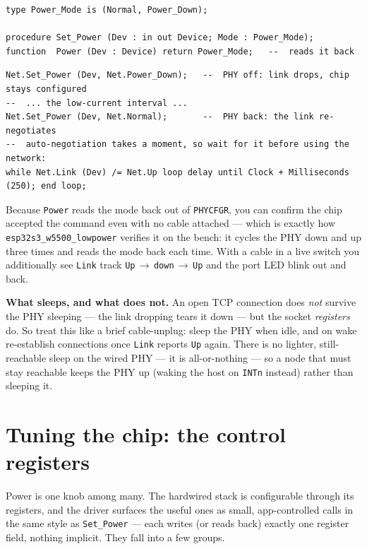 \begin{lstlisting}
type Power_Mode is (Normal, Power_Down);

procedure Set_Power (Dev : in out Device; Mode : Power_Mode);
function  Power (Dev : Device) return Power_Mode;   --  reads it back
\end{lstlisting}

\begin{lstlisting}
Net.Set_Power (Dev, Net.Power_Down);   --  PHY off: link drops, chip stays configured
--  ... the low-current interval ...
Net.Set_Power (Dev, Net.Normal);       --  PHY back: the link re-negotiates
--  auto-negotiation takes a moment, so wait for it before using the network:
while Net.Link (Dev) /= Net.Up loop delay until Clock + Milliseconds (250); end loop;
\end{lstlisting}

Because \texttt{Power} reads the mode back out of \texttt{PHYCFGR}, you can confirm
the chip accepted the command even with no cable attached --- which is exactly how
\texttt{esp32s3\_w5500\_lowpower} verifies it on the bench: it cycles the PHY down
and up three times and reads the mode back each time. With a cable in a live switch
you additionally see \texttt{Link} track \texttt{Up}\,$\to$\,\texttt{down}\,$\to$\,\texttt{Up}
and the port LED blink out and back.

\textbf{What sleeps, and what does not.} An open TCP connection does \emph{not}
survive the PHY sleeping --- the link dropping tears it down --- but the socket
\emph{registers} do. So treat this like a brief cable-unplug: sleep the PHY when
idle, and on wake re-establish connections once \texttt{Link} reports \texttt{Up}
again. There is no lighter, still-reachable sleep on the wired PHY --- it is
all-or-nothing --- so a node that must stay reachable keeps the PHY up (waking the
host on \texttt{INTn} instead) rather than sleeping it.

\section{Tuning the chip: the control registers}
\label{ch:net:control}

Power is one knob among many. The hardwired stack is configurable through its
registers, and the driver surfaces the useful ones as small, app-controlled calls
in the same style as \texttt{Set\_Power} --- each writes (or reads back) exactly one
register field, nothing implicit. They fall into a few groups.

